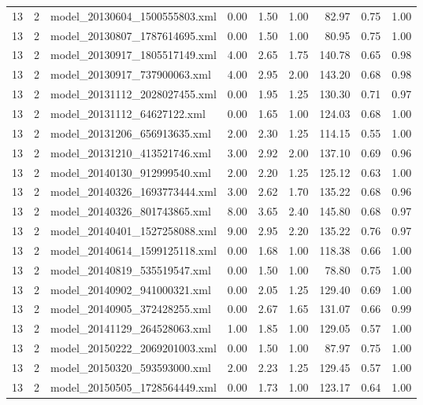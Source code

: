 \begin{table}[ht]
\begin{tabular}{rrlrrrrrr}
   13 &   2 & model\_20130604\_1500555803.xml & 0.00 & 1.50 & 1.00 & 82.97 & 0.75 & 1.00 \\ 
   13 &   2 & model\_20130807\_1787614695.xml & 0.00 & 1.50 & 1.00 & 80.95 & 0.75 & 1.00 \\ 
   13 &   2 & model\_20130917\_1805517149.xml & 4.00 & 2.65 & 1.75 & 140.78 & 0.65 & 0.98 \\ 
   13 &   2 & model\_20130917\_737900063.xml & 4.00 & 2.95 & 2.00 & 143.20 & 0.68 & 0.98 \\ 
   13 &   2 & model\_20131112\_2028027455.xml & 0.00 & 1.95 & 1.25 & 130.30 & 0.71 & 0.97 \\ 
   13 &   2 & model\_20131112\_64627122.xml & 0.00 & 1.65 & 1.00 & 124.03 & 0.68 & 1.00 \\ 
   13 &   2 & model\_20131206\_656913635.xml & 2.00 & 2.30 & 1.25 & 114.15 & 0.55 & 1.00 \\ 
   13 &   2 & model\_20131210\_413521746.xml & 3.00 & 2.92 & 2.00 & 137.10 & 0.69 & 0.96 \\ 
   13 &   2 & model\_20140130\_912999540.xml & 2.00 & 2.20 & 1.25 & 125.12 & 0.63 & 1.00 \\ 
   13 &   2 & model\_20140326\_1693773444.xml & 3.00 & 2.62 & 1.70 & 135.22 & 0.68 & 0.96 \\ 
   13 &   2 & model\_20140326\_801743865.xml & 8.00 & 3.65 & 2.40 & 145.80 & 0.68 & 0.97 \\ 
   13 &   2 & model\_20140401\_1527258088.xml & 9.00 & 2.95 & 2.20 & 135.22 & 0.76 & 0.97 \\ 
   13 &   2 & model\_20140614\_1599125118.xml & 0.00 & 1.68 & 1.00 & 118.38 & 0.66 & 1.00 \\ 
   13 &   2 & model\_20140819\_535519547.xml & 0.00 & 1.50 & 1.00 & 78.80 & 0.75 & 1.00 \\ 
   13 &   2 & model\_20140902\_941000321.xml & 0.00 & 2.05 & 1.25 & 129.40 & 0.69 & 1.00 \\ 
   13 &   2 & model\_20140905\_372428255.xml & 0.00 & 2.67 & 1.65 & 131.07 & 0.66 & 0.99 \\ 
   13 &   2 & model\_20141129\_264528063.xml & 1.00 & 1.85 & 1.00 & 129.05 & 0.57 & 1.00 \\ 
   13 &   2 & model\_20150222\_2069201003.xml & 0.00 & 1.50 & 1.00 & 87.97 & 0.75 & 1.00 \\ 
   13 &   2 & model\_20150320\_593593000.xml & 2.00 & 2.23 & 1.25 & 129.45 & 0.57 & 1.00 \\ 
   13 &   2 & model\_20150505\_1728564449.xml & 0.00 & 1.73 & 1.00 & 123.17 & 0.64 & 1.00 \\ 

\end{tabular}
\end{table}
